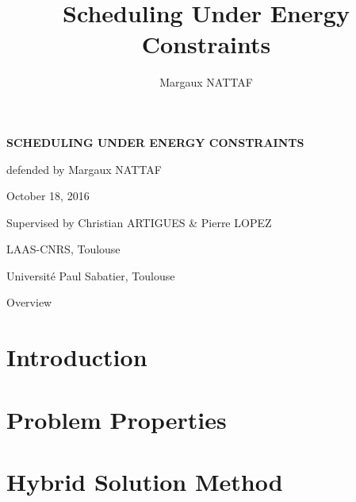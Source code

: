 \documentclass{beamer}
\title{Scheduling Under Energy Constraints}
\author{Margaux NATTAF}
\institute{LAAS-CNRS Toulouse

  Université Paul Sabatier Toulouse}
\begin{document}
{\canvasspecial
  \begin{frame}
    \vspace{1.5cm}
    \begin{flushleft}
      {\Large \bf \color{bleuLAAS}SCHEDULING UNDER ENERGY CONSTRAINTS}
      
      \vspace{0.3cm}
      \small \color{bleuLAAS!90} defended by Margaux NATTAF

      October 18, 2016
    \end{flushleft}
    \vspace{0.5cm}

    {\footnotesize  \color{bleuLAAS!80}
      Supervised by Christian ARTIGUES \& Pierre LOPEZ}

    \vspace{1.5cm}
    \begin{flushright} \color{bleuLAAS!70}
      \scriptsize LAAS-CNRS, Toulouse

      Université Paul Sabatier, Toulouse
    \end{flushright}
  \end{frame}}

\setcounter{framenumber}{0}


\setcounter{tocdepth}{1}
\begin{frame}{Overview}
  \tableofcontents[hideothersubsections,subsubsectionstyle={show/show/show/show}]
\end{frame}

\section{Introduction}



\setcounter{tocdepth}{2}
\section{Problem Properties}

\section{Hybrid Solution Method}
 
\end{document}
